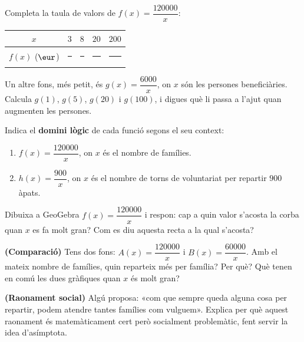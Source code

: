 \begin{exercicis}
\begin{exlist}
  \item Completa la taula de valors de $f(x)=\dfrac{\num{120000}}{x}$:
        \begin{center}
        \begin{tabular}{c c c c c}
        \toprule
        $x$ & $3$ & $8$ & $20$ & $200$ \\
        \midrule
        $f(x)$ ($\eur$) & \rule{1.6cm}{0.4pt} & \rule{1.6cm}{0.4pt} & \rule{1.6cm}{0.4pt} & \rule{1.6cm}{0.4pt} \\
        \bottomrule
        \end{tabular}
        \end{center}
  \item Un altre fons, més petit, és $g(x)=\dfrac{\num{6000}}{x}$, on $x$ són les
        persones beneficiàries. Calcula $g(1)$, $g(5)$, $g(20)$ i $g(100)$, i digues
        què li passa a l'ajut quan augmenten les persones.
  \item Indica el \textbf{domini lògic} de cada funció segons el seu context:
        \begin{enumerate}[label=\alph*), leftmargin=1.6em, topsep=2pt]
          \item $f(x)=\dfrac{\num{120000}}{x}$, on $x$ és el nombre de famílies.
          \item $h(x)=\dfrac{900}{x}$, on $x$ és el nombre de torns de voluntariat per
                repartir $900$ àpats.
        \end{enumerate}
  \item Dibuixa a GeoGebra $f(x)=\dfrac{\num{120000}}{x}$ i respon: cap a quin valor
        s'acosta la corba quan $x$ es fa molt gran? Com es diu aquesta recta a la qual
        s'acosta?
  \item \textbf{(Comparació)} Tens dos fons: $A(x)=\dfrac{\num{120000}}{x}$ i
        $B(x)=\dfrac{\num{60000}}{x}$. Amb el mateix nombre de famílies, quin reparteix
        més per família? Per què? Què tenen en comú les dues gràfiques quan $x$ és molt
        gran?
  \item \textbf{(Raonament social)} Algú proposa: «com que sempre queda alguna cosa
        per repartir, podem atendre tantes famílies com vulguem». Explica per què
        aquest raonament és matemàticament cert però socialment problemàtic, fent
        servir la idea d'asímptota.
\end{exlist}
\end{exercicis}

